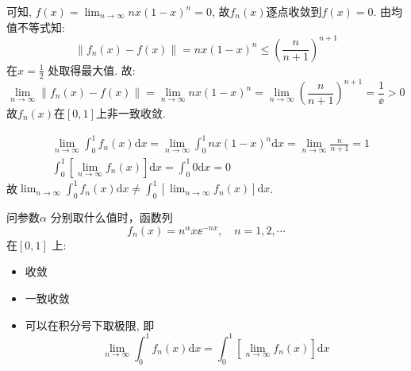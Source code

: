 \begin{solution}
    可知, \(f(x) = \lim_{n \to \infty} nx(1-x)^n = 0\),
    故\(f_{n}(x)\)逐点收敛到\(f(x) = 0\).
    由均值不等式知: \[
        \left\lVert f_{n}(x) - f(x) \right\rVert =
        nx(1-x)^{n} \le \left( \frac{n}{n + 1} \right)^{n+1}
    \]
    在\(x = \frac{1}{2}\) 处取得最大值.
    故: \[
        \lim_{n \to \infty} \left\lVert f_{n}(x) - f(x) \right\rVert
        = \lim_{n \to \infty} nx(1-x)^{n} = \lim_{n \to \infty}
        \left( \frac{n}{n + 1} \right)^{n+1} = \frac{1}{\ee} > 0
    \]
    故\(f_{n}(x)\)在\([0,1]\)上非一致收敛.

    \begin{align*}
        & \lim_{n \to \infty} \int_0^1 f_n(x) \mathrm{d}x
        = \lim_{n \to \infty} \int_0^1 nx(1-x)^n \mathrm{d}x
        = \lim_{n \to \infty} \frac{n}{n+1} = 1                           \\
        & \int_0^1 \left[ \lim_{n \to \infty} f_n(x) \right] \mathrm{d}x
        = \int_0^1 0 \mathrm{d}x = 0
    \end{align*}
    故\(\lim_{n \to \infty} \int_0^1 f_n(x) \mathrm{d}x \neq \int_0^1
    \left[\lim_{n \to \infty} f_n(x) \right] \mathrm{d}x\).
\end{solution}

\begin{problem}
    问参数\(\alpha\) 分别取什么值时，函数列
    \[
        f_n(x) = n^\alpha x\ee^{-n x}, \quad n = 1, 2, \cdots
    \] 在\([0,1]\) 上:
    \begin{itemize}
        \item 收敛
        \item 一致收敛
        \item 可以在积分号下取极限, 即\[
                \lim_{n \to \infty} \int_0^1 f_n(x) \mathrm{d}x = \int_0^1
                \left[ \lim_{n \to \infty} f_n(x) \right] \mathrm{d}x
            \]
    \end{itemize}
\end{problem}

